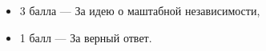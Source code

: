 \begin{itemize}
	\item{3 балла} --- За идею о маштабной независимости,
	\item{1 балл} --- За верный ответ.
\end{itemize}